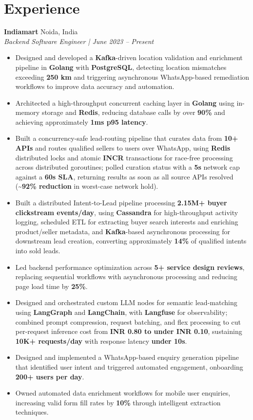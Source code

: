 \documentclass[8pt,a4paper]{extarticle}
\newcommand{\role}[2]{%
  \noindent\textbf{#1} \hfill #2\\[1pt]
}
\begin{document}
\section*{Experience}

\role{Indiamart}{Noida, India}
\textit{Backend Software Engineer | June 2023 -- Present}
\begin{itemize}
  \item Designed and developed a \textbf{Kafka}-driven location validation and enrichment pipeline in \textbf{Golang} with \textbf{PostgreSQL}, detecting location mismatches exceeding \textbf{250 km} and triggering asynchronous WhatsApp-based remediation workflows to improve data accuracy and automation.
  \item Architected a high-throughput concurrent caching layer in \textbf{Golang} using in-memory storage and \textbf{Redis}, reducing database calls by over \textbf{90\%} and achieving approximately \textbf{1ms p95 latency}.
  \item Built a concurrency-safe lead-routing pipeline that curates data from \textbf{10+ APIs} and routes qualified sellers to users over WhatsApp, using \textbf{Redis} distributed locks and atomic \textbf{INCR} transactions for race-free processing across distributed goroutines; polled curation status with a \textbf{5s} network cap against a \textbf{60s SLA}, returning results as soon as all source APIs resolved (\textbf{\textasciitilde{}92\% reduction} in worst-case network hold).
  \item Built a distributed Intent-to-Lead pipeline processing \textbf{2.15M+ buyer clickstream events/day}, using \textbf{Cassandra} for high-throughput activity logging, scheduled ETL for extracting buyer search interests and enriching product/seller metadata, and \textbf{Kafka}-based asynchronous processing for downstream lead creation, converting approximately \textbf{14\%} of qualified intents into sold leads.
  \item Led backend performance optimization across \textbf{5+ service design reviews}, replacing sequential workflows with asynchronous processing and reducing page load time by \textbf{25\%}.
  \item Designed and orchestrated custom LLM nodes for semantic lead-matching using \textbf{LangGraph} and \textbf{LangChain}, with \textbf{Langfuse} for observability; combined prompt compression, request batching, and flex processing to cut per-request inference cost from \textbf{INR 0.80 to under INR 0.10}, sustaining \textbf{10K+ requests/day} with response latency \textbf{under 10s}.
  \item Designed and implemented a WhatsApp-based enquiry generation pipeline that identified user intent and triggered automated engagement, onboarding \textbf{200+ users per day}.
  \item Owned automated data enrichment workflows for mobile user enquiries, increasing valid form fill rates by \textbf{10\%} through intelligent extraction techniques.
\end{itemize}
\end{document}
